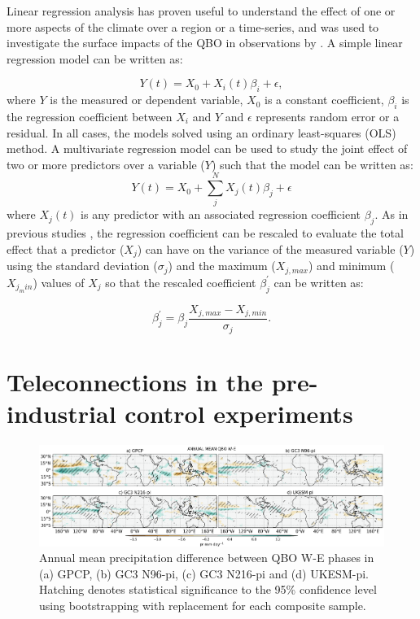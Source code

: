 Linear regression analysis has proven useful to understand the effect of one or more aspects of the climate over a region or a time-series, and was used to investigate the surface impacts of the QBO in observations by \cite{gray2018}. 
A simple linear regression model can be written as:

\begin{equation}
Y(t)=X_0+X_i(t)\beta_i + \epsilon,
\end{equation}
\noindent where $Y$ is the measured or dependent variable, $X_0$ is a constant coefficient, $\beta_i$ is the regression coefficient between $X_i$ and $Y$ and $\epsilon$ represents random error or a residual.  In all cases, the models solved using an ordinary least-squares (OLS) method.
A multivariate regression model can be used to study the joint effect of two or more predictors over a variable ($Y$) such that the model can be written as:
\begin{equation}
Y(t)=X_0+\sum_j^NX_j(t)\beta_j+\epsilon
\end{equation}
\noindent where $X_j(t)$ is any predictor with an associated regression coefficient $\beta_j$. 
As in previous studies \citep{gray2018,misios2019slowdown}, the regression coefficient can be rescaled to evaluate the total effect that a predictor ($X_j$) can have on the variance of the measured variable ($Y$) using the standard deviation ($\sigma_j$) and the maximum ($X_{j,max}$) and minimum ($X_{j_min}$) values of $X_j$ so that the rescaled coefficient $\beta_j^\prime$ can be written as:

\begin{equation}
\beta_j^\prime=\beta_j\frac{X_{j,max}-X_{j,min}}{\sigma_j}.
\end{equation}

\section{Teleconnections in the pre-industrial control experiments}\label{sq:cmip6_qbo}

\begin{figure}[b!]
\centering
 \includegraphics[width=\linewidth]{figures/piprclimqbowqboe.png}
\caption[Annual mean precipitation composite difference QBO W-E ]{ Annual mean precipitation difference between QBO W-E phases in (a) GPCP, (b) GC3 N96-pi, (c) GC3 N216-pi and (d) UKESM-pi. Hatching denotes statistical significance to the 95\% confidence level using bootstrapping with replacement for each composite sample. }
\label{fig:qboclim}
\end{figure}

